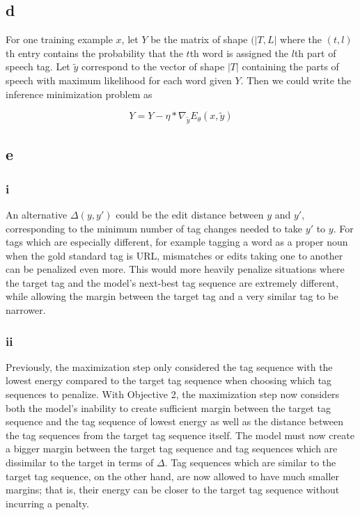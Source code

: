 \documentclass{article}
\begin{document}
\subsection{d}
For one training example $x$, let $Y$ be the matrix of shape $(|T, L|$ where the $(t, l)$th entry contains the probability that the $t$th word is assigned the $l$th part of speech tag. Let $\tilde{y}$ correspond to the vector of shape $|T|$ containing the parts of speech with maximum likelihood for each word given $Y$. Then we could write the inference minimization problem as 

$$ Y = Y - \eta * \nabla_{\tilde{y}} E_\theta (x,\tilde{y})$$

\subsection{e}

\subsubsection{i}
An alternative $\Delta(y, y')$ could be the edit distance between $y$ and $y'$, corresponding to the minimum number of tag changes needed to take $y'$ to $y$. For tags which are especially different, for example tagging a word as a proper noun when the gold standard tag is URL, mismatches or edits taking one to another can be penalized even more. This would more heavily penalize situations where the target tag and the model's next-best tag sequence are extremely different, while allowing the margin between the target tag and a very similar tag to be narrower.

\subsubsection{ii}
Previously, the maximization step only considered the tag sequence with the lowest energy compared to the target tag sequence when choosing which tag sequences to penalize. With Objective 2, the maximization step now considers both the model's inability to create sufficient margin between the target tag sequence and the tag sequence of lowest energy as well as the distance between the tag sequences from the target tag sequence itself. The model must now create a bigger margin between the target tag sequence and tag sequences which are dissimilar to the target in terms of $\Delta$. Tag sequences which are similar to the target tag sequence, on the other hand, are now allowed to have much smaller margins; that is, their energy can be closer to the target tag sequence without incurring a penalty.
\end{document}
